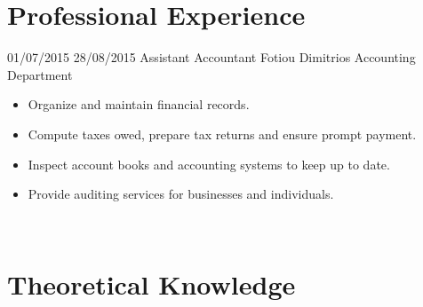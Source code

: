 \documentclass[letterpaper]{engineer_cv} %
\begin{document}

	\section{Professional Experience}

	\begin{longList} %
		\longListItem
			{01/07/2015}
			{28/08/2015}
			{Assistant Accountant}
			{Fotiou Dimitrios Accounting Department}
			{}
			{\begin{itemize}
				\item Organize and maintain financial records.
				\item Compute taxes owed, prepare tax returns and ensure prompt payment.
                \item Inspect account books and accounting systems to keep up to date.
                \item Provide auditing services for businesses and individuals.
			\end{itemize}}
			\\
        \end{longList}


        \clearpage

	\infographics


	\section{Theoretical Knowledge}
\end{document}
